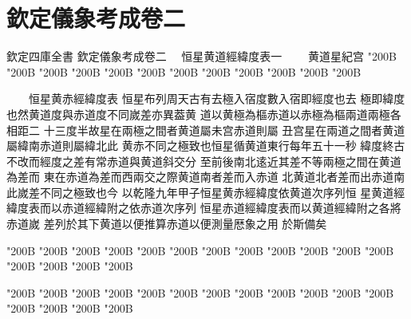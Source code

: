 \chapter*{欽定儀象考成卷二}
\begin{正文}
欽定四庫全書
欽定儀象考成卷二
　恒星黄道經緯度表一
　　黄道星紀宫
\char"200B\relax{}
\char"200B\relax{}
\char"200B\relax{}
\char"200B\relax{}
\char"200B\relax{}
\char"200B\relax{}
\char"200B\relax{}
\char"200B\relax{}
\char"200B\relax{}
\char"200B\relax{}
\char"200B\relax{}
\char"200B\relax
\par
　　恒星黄赤經緯度表
恒星布列周天古有去極入宿度數入宿即經度也去
極即緯度也然黄道度與赤道度不同嵗差亦異葢黄
道以黄極為樞赤道以赤極為樞兩道兩極各相距二
十三度半故星在兩極之間者黄道屬未宫赤道則屬
丑宫星在兩道之間者黄道屬緯南赤道則屬緯北此
黄赤不同之極致也恒星循黄道東行每年五十一秒
緯度終古不改而經度之差有常赤道與黄道斜交分
至前後南北逺近其差不等兩極之間在黄道為差而
東在赤道為差而西兩交之際黄道南者差而入赤道
北黄道北者差而出赤道南此嵗差不同之極致也今
以乾隆九年甲子恒星黄赤經緯度依黄道次序列恒
星黄道經緯度表而以赤道經緯附之依赤道次序列
恒星赤道經緯度表而以黄道經緯附之各將赤道嵗
差列於其下黄道以便推算赤道以便測量厯象之用
於斯備矣
\par
\end{正文}\clearpage
{}
\begin{正文}
\char"200B\relax{}
\char"200B\relax{}
\char"200B\relax{}
\char"200B\relax{}
\char"200B\relax{}
\char"200B\relax{}
\char"200B\relax{}
\char"200B\relax{}
\char"200B\relax{}
\char"200B\relax{}
\char"200B\relax{}
\char"200B\relax{}
\char"200B\relax{}
\char"200B\relax{}
\char"200B\relax{}
\char"200B\relax
{}\par
\end{正文}\clearpage
{}
\begin{正文}
\char"200B\relax{}
\char"200B\relax{}
\char"200B\relax{}
\char"200B\relax{}
\char"200B\relax{}
\char"200B\relax{}
\char"200B\relax{}
\char"200B\relax{}
\char"200B\relax{}
\char"200B\relax{}
\char"200B\relax{}
\char"200B\relax{}
\char"200B\relax{}
\char"200B\relax{}
\char"200B\relax{}
\char"200B\relax
{}\par
\end{正文}\clearpage
